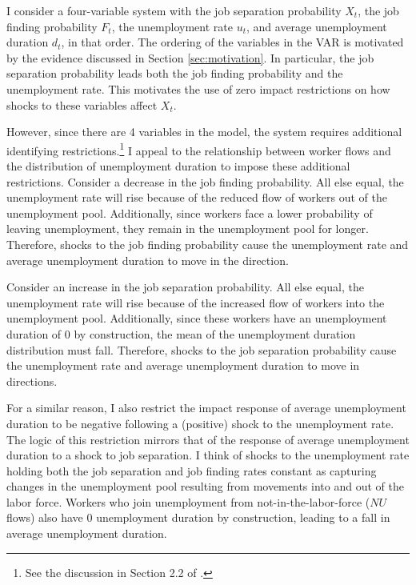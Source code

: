 \documentclass[12pt]{article}
\begin{document}
I consider a four-variable system with the job separation probability $X_t$, the job finding probability $F_t$, the unemployment rate $u_t$, and average unemployment duration $d_t$, in that order. The ordering of the variables in the VAR is motivated by the evidence discussed in Section \ref{sec:motivation}. In particular, the job separation probability leads both the job finding probability and the unemployment rate. This motivates the use of zero impact restrictions on how shocks to these variables affect $X_t$.

However, since there are 4 variables in the model, the system requires additional identifying restrictions.\footnote{See the discussion in Section 2.2 of \cite{Arias:2018aa}.} I appeal to the relationship between worker flows and the distribution of unemployment duration to impose these additional restrictions. Consider a decrease in the job finding probability. All else equal, the unemployment rate will rise because of the reduced flow of workers out of the unemployment pool. Additionally, since workers face a lower probability of leaving unemployment, they remain in the unemployment pool for longer. Therefore, shocks to the job finding probability cause the unemployment rate and average unemployment duration to move in the  direction.

Consider an increase in the job separation probability. All else equal, the unemployment rate will rise because of the increased flow of workers into the unemployment pool. Additionally, since these workers have an unemployment duration of 0 by construction, the mean of the unemployment duration distribution must fall. Therefore, shocks to the job separation probability cause the unemployment rate and average unemployment duration to move in  directions.

For a similar reason, I also restrict the impact response of average unemployment duration to be negative following a (positive) shock to the unemployment rate. The logic of this restriction mirrors that of the response of average unemployment duration to a shock to job separation. I think of shocks to the unemployment rate holding both the job separation and job finding rates constant as capturing changes in the unemployment pool resulting from movements into and out of the labor force. Workers who join unemployment from not-in-the-labor-force ($NU$ flows) also have 0 unemployment duration by construction, leading to a fall in average unemployment duration.
\end{document}
